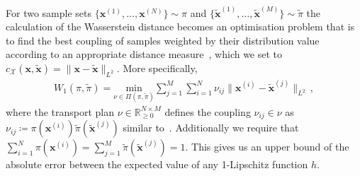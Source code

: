 For two sample sets $\{ \bm{x}^{(1)},\dots,\bm{x}^{(N)}\} \sim \pi$ and $\{\tilde{ \bm{x}}^{(1)},\dots,\tilde{\bm{x}}^{(M)}\} \sim \tilde{\pi}$ the calculation of the Wasserstein distance becomes an optimisation problem that is to find the best coupling of samples weighted by their distribution value according to an appropriate distance measure~\cite{feydy2020OT}, which we set to $c_{\mathcal{X}}(\bm{x},\tilde{\bm{x}})= \lVert \bm{x} -\tilde{\bm{x}} \rVert_{L^2} $.
More specifically,
\begin{align}
	W_1(\pi,\tilde{\pi}) = 	\underset{\nu \in \Pi(\pi,\tilde{\pi}) }{\text{min}} \sum^M_{j = 1} \sum^N_{i =1}  \nu_{ij} \lVert\bm{x}^{(i)}  -  \tilde{\bm{x}}^{(j)} \rVert_{L^2} \, , \label{eq:applWasser}
\end{align}
where the transport plan $\nu \in \mathbb{R}^{N \times M}_ {\geq 0}$ defines the coupling $\nu_{ij} \in \nu $ as $ \nu_{ij} \coloneqq \pi(\bm{x}^{(i)}) \tilde{\pi}(\tilde{\bm{x}}^{(j)})$ similar to~\cite[Eq. 3.166]{feydy2020OT}.
Additionally we require that $\sum^N_{i =1} \pi(\bm{x}^{(i)}) = \sum^M_{j = 1} \tilde{\pi}(\tilde{\bm{x}}^{(j)})= 1 $.
This gives us an upper bound of the absolute error between the expected value of any 1-Lipschitz function $h$.

